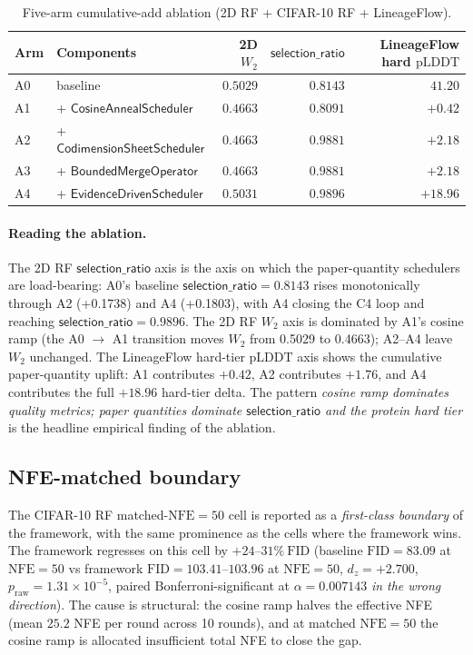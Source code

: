 \documentclass[journal,twocolumn,final]{IEEEtran}
\newcommand{\NFE}{\mathrm{NFE}}
\newcommand{\pr}{p_{\mathrm{raw}}}
\newcommand{\dz}{d_z}
\newcommand{\wftwo}{W_2}
\newcommand{\pLDDT}{\mathrm{pLDDT}}
\newcommand{\FID}{\mathrm{FID}}
\begin{document}
\begin{table}[ht]
\centering
\caption{Five-arm cumulative-add ablation (2D RF + CIFAR-10 RF + LineageFlow).}
\label{tab:ablation}
\scriptsize
\begin{tabular}{llrrr}
\toprule
\textbf{Arm} & \textbf{Components} &
  \textbf{2D $\wftwo$} &
  \textbf{$\mathsf{selection\_ratio}$} &
  \textbf{LineageFlow hard $\pLDDT$} \\
\midrule
A0 & baseline                              & $0.5029$ & $0.8143$ & $41.20$ \\
A1 & + $\mathsf{CosineAnnealScheduler}$      & $\mathbf{0.4663}$ & $0.8091$ & $+0.42$ \\
A2 & + $\mathsf{CodimensionSheetScheduler}$  & $0.4663$ & $\mathbf{0.9881}$ & $+2.18$ \\
A3 & + $\mathsf{BoundedMergeOperator}$       & $0.4663$ & $0.9881$ & $+2.18$ \\
A4 & + $\mathsf{EvidenceDrivenScheduler}$    & $0.5031$ & $\mathbf{0.9896}$ & $\mathbf{+18.96}$ \\
\bottomrule
\end{tabular}
\end{table}

\paragraph{Reading the ablation.}
The 2D RF $\mathsf{selection\_ratio}$ axis is the axis on which the
paper-quantity schedulers are load-bearing: A0's baseline $\mathsf{selection\_ratio}
= 0.8143$ rises monotonically through A2 (+0.1738) and A4 (+0.1803), with A4
closing the C4 loop and reaching $\mathsf{selection\_ratio} = 0.9896$. The 2D
RF $\wftwo$ axis is dominated by A1's cosine ramp (the A0 $\to$ A1 transition
moves $\wftwo$ from 0.5029 to 0.4663); A2--A4 leave $\wftwo$ unchanged. The
LineageFlow hard-tier $\pLDDT$ axis shows the cumulative paper-quantity uplift:
A1 contributes $+0.42$, A2 contributes $+1.76$, and A4 contributes the full
$+18.96$ hard-tier delta. The pattern \emph{cosine ramp dominates quality
metrics; paper quantities dominate $\mathsf{selection\_ratio}$ and the protein
hard tier} is the headline empirical finding of the ablation.

\subsection{NFE-matched boundary}

The CIFAR-10 RF matched-$\NFE = 50$ cell is reported as a \emph{first-class
boundary} of the framework, with the same prominence as the cells where the
framework wins. The framework regresses on this cell by $+24$--$31\%~\FID$
(baseline $\FID = 83.09$ at $\NFE = 50$ vs framework $\FID = 103.41$--$103.96$
at $\NFE = 50$, $\dz = +2.700$, $\pr = 1.31\!\times\!10^{-5}$, paired
Bonferroni-significant at $\alpha = 0.007143$ \emph{in the wrong direction}).
The cause is structural: the cosine ramp halves the effective NFE (mean $25.2$
NFE per round across 10 rounds), and at matched $\NFE = 50$ the cosine ramp
is allocated insufficient total NFE to close the gap.
\end{document}
